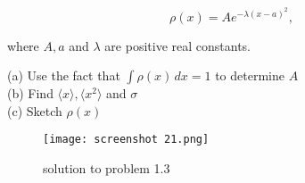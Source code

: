 \documentclass[svgnames]{article}   	%
\begin{document}
\vspace{5px} \[
  \rho(x) = Ae^{-\lambda (x-a)^2}, 
\] \vspace{5px}

where $A, a$ and  $\lambda$ are positive real constants. 

\begin{tcolorbox}	
  
  (a) Use the fact that $\int \rho(x) \, dx = 1$ to determine  $A$ \\
  (b) Find $\langle x \rangle, \langle x^2 \rangle$ and $\sigma$ \\
  (c) Sketch $\rho(x)$

\end{tcolorbox}	

\begin{figure}[htb!]
  \centering
    \texttt{[image: screenshot 21.png]}
    \caption{solution to problem 1.3}
\end{figure}
\end{document}
